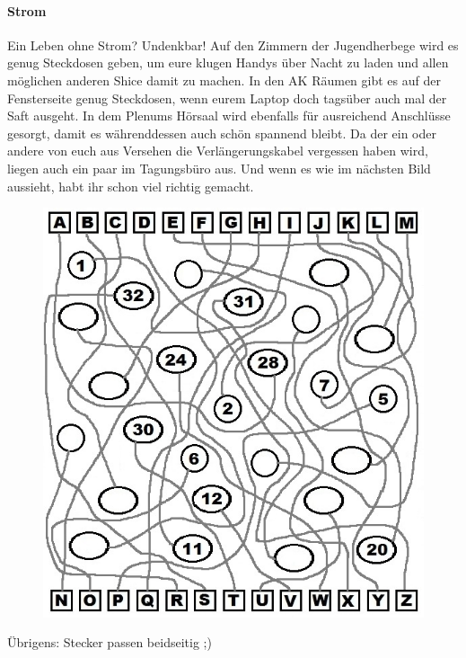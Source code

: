 \paragraph{Strom}
Ein Leben ohne Strom? Undenkbar! Auf den Zimmern der Jugendherbege wird es genug Steckdosen geben, um eure klugen Handys über Nacht zu laden und allen möglichen anderen Shice damit zu machen. In den AK Räumen gibt es auf der Fensterseite genug Steckdosen, wenn eurem Laptop doch tagsüber auch mal der Saft ausgeht. In dem Plenums Hörsaal wird ebenfalls für ausreichend Anschlüsse gesorgt, damit es währenddessen auch schön spannend bleibt. Da der ein oder andere von euch aus Versehen die Verlängerungskabel vergessen haben wird, liegen auch ein paar im Tagungsbüro aus. Und wenn es wie im nächsten Bild aussieht, habt ihr schon viel richtig gemacht.
\begin{figure}[h]
\centering
\includegraphics[width=\textwidth]{chapters/survive/kabel_raetsel.jpg}
\end{figure}
Übrigens: Stecker passen beidseitig ;)

